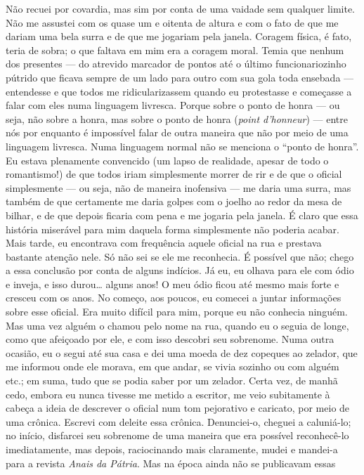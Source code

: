 Não recuei por covardia, mas sim por conta de uma vaidade sem qualquer limite.
Não me assustei com os quase um e oitenta de altura e com o fato de que me
dariam uma bela surra e de que me jogariam pela janela.  Coragem física, é
fato, teria de sobra; o que faltava em mim era a coragem moral. Temia que
nenhum dos presentes --- do atrevido marcador de pontos até o último
funcionariozinho pútrido que ficava sempre de um lado para outro com sua gola
toda ensebada --- entendesse e que todos me ridicularizassem quando eu
protestasse e começasse a falar com eles numa linguagem livresca. Porque sobre
o ponto de honra --- ou seja, não sobre a honra, mas sobre o ponto de honra
(\textit{point d’honneur}) --- entre nós por enquanto é impossível falar de
outra maneira que não por meio de uma linguagem livresca. Numa linguagem normal
não se menciona o “ponto de honra”. Eu estava plenamente convencido (um lapso
de realidade, apesar de todo o romantismo!) de que todos iriam simplesmente
morrer de rir e de que o oficial simplesmente --- ou seja, não de maneira
inofensiva --- me daria uma surra, mas também de que certamente me daria golpes
com o joelho ao redor da mesa de bilhar, e de que depois ficaria com pena e me
jogaria pela janela. É claro que essa história miserável para mim daquela forma
simplesmente não poderia acabar. Mais tarde, eu encontrava com frequência
aquele oficial na rua e prestava bastante atenção nele. Só não sei se ele me
reconhecia. É possível que não; chego a essa conclusão por conta de alguns
indícios. Já eu, eu olhava para ele com ódio e inveja, e isso durou\ldots{}
alguns anos! O meu ódio ficou até mesmo mais forte e cresceu com os anos. No
começo, aos poucos, eu comecei a juntar informações sobre esse oficial. Era
muito difícil para mim, porque eu não conhecia ninguém. Mas uma vez alguém o
chamou pelo nome na rua, quando eu o seguia de longe, como que afeiçoado por
ele, e com isso descobri seu sobrenome. Numa outra ocasião, eu o segui até sua
casa e dei uma moeda de dez copeques ao zelador, que me informou onde ele
morava, em que andar, se vivia sozinho ou com alguém etc.; em suma, tudo que se
podia saber por um zelador. Certa vez, de manhã cedo, embora eu nunca tivesse
me metido a escritor, me veio subitamente à cabeça a ideia de descrever o
oficial num tom pejorativo e caricato, por meio de uma crônica. Escrevi com
deleite essa crônica. Denunciei-o, cheguei a caluniá-lo; no início, disfarcei
seu sobrenome de uma maneira que era possível reconhecê-lo imediatamente, mas
depois, raciocinando mais claramente, mudei e mandei-a para a revista
\textit{Anais da Pátria}. Mas na época ainda não se publicavam essas
